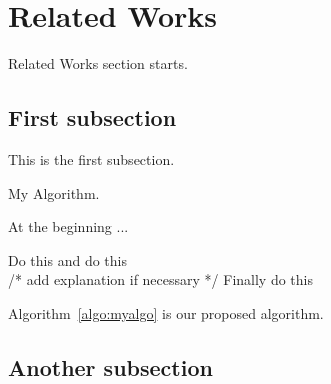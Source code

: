\section{Related Works}
Related Works section starts. 

\subsection{First subsection}
This is the first subsection. 


\begin{algorithm}
	\caption{My Algorithm.} \label{algo:myalgo}
    At the beginning ...
    
	\begin{algorithmic}[1]	    
	    \STATE Do this
        \STATE and do this\\
        /* add explanation if necessary */
        \STATE Finally do this
	\end{algorithmic} 
\end{algorithm}
%
Algorithm~\ref{algo:myalgo} is our proposed algorithm.

\subsection{Another subsection}
